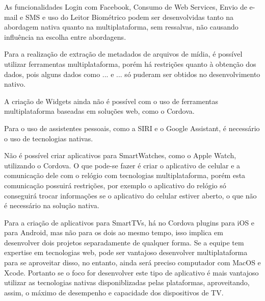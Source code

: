\begin{comment}
	\item \textbf{Câmeras customizadas}: É possível desenvolver aplicativos multiplataforma com cameras customizadas, porem quanto maior a customização mais dificil o desenvolvimento, tanto para nativo quanto para 
	multiplataforma, entao cabe a avaliacao da expertise da equipe para saber o que é melhor, pode ser muito decisivo...
	\item \textbf{Detecção facial}: É possível desenvolver multiplataforma pois exsitem frameworks e plugins para isso, deve-se considerar a performance do aplicativo e uso da internet, pode ser muito decisivo...
\end{itemize}
\end{comment}

As funcionalidades Login com Facebook, Consumo de Web Services, Envio de e-mail e SMS e uso do Leitor Biométrico 
podem ser desenvolvidas tanto na abordagem nativa quanto na multiplataforma, sem ressalvas, não causando influência 
na escolha entre abordagens.

Para a realização de extração de metadados de arquivos de mídia, é possível utilizar ferramentas multiplataforma, 
porém há restrições quanto à obtenção dos dados, pois alguns dados como ... e ... só puderam ser obtidos no desenvolvimento
nativo.

A criação de Widgets ainda não é possível com o uso de ferramentas multiplataforma baseadas em soluções web, como o Cordova.

Para o uso de assistentes pessoais, como a SIRI e o Google Assistant, é necessário o uso de tecnologias nativas.

Não é possível criar aplicativos para SmartWatches, como o Apple Watch, utilizando o Cordova. O que pode-se fazer é criar
o aplicativo de celular e a comunicação dele com o relógio com tecnologias multiplataforma, porém esta comunicação possuirá
restrições, por exemplo o aplicativo do relógio só conseguirá trocar informações se o aplicativo do celular estiver aberto,
o que não é necessário na solução nativa.

Para a criação de aplicativos para SmartTVs, há no Cordova plugins para iOS e para Android, mas não para os dois ao mesmo tempo, 
isso implica em desenvolver dois projetos separadamente de qualquer forma. 
Se a equipe tem expertise em tecnologias web, pode ser vantajoso desenvolver multiplataforma 
para se aproveitar disso, no entanto, ainda será preciso computador com MacOS e Xcode. 
Portanto se o foco for desenvolver este tipo de aplicativo é mais vantajoso utilizar as tecnologias nativas disponiblizadas pelas 
plataformas, aproveitando, assim, o máximo de desempenho e capacidade dos dispositivos de TV.


